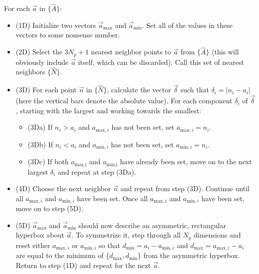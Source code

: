 \documentclass[useAMS,usenatbib]{aastex}
\begin{document}
For each $\vec{a}$ in $\{\hat{A}\}$:
\begin{itemize}
\item(1D) Initialize two vectors $\vec{a}_\text{max}$ and
$\vec{a}_\text{min}$.  Set all of the values in these vectors to some nonsense number.

\item(2D) Select the $3N_p+1$ nearest neighbor points to $\vec{a}$ from
$\{\hat{A}\}$ (this will obviously include $\vec{a}$ itself, which can be discarded).  Call
this set of nearest neighbors $\{\hat{N}\}$.
\\
\item(3D) For each point $\vec{n}$ in $\{\hat{N}\}$, calculate the vector
$\vec{\delta}$ such that $\delta_i=|n_i-a_i|$ (here the vertical bars denote the absolute value).  
For each component
$\delta_i$ of $\vec{\delta}$, starting with the largest and working towards the smallest:
\\
\begin{itemize}
\item(3Da) If $n_i>a_i$ and $a_{\text{max},i}$ has not been set, set $a_{\text{max},i}=n_i$.
\\
\item(3Db) If $n_i<a_i$ and $a_{\text{min},i}$ has not been set, set $a_{\text{min},i}=n_i$.
\\
\item(3Dc) If both $a_\text{max,i}$ and $a_\text{min,i}$ have already been set, move on to the
next largest $\delta_i$ and repeat at step (3Da).
\end{itemize}
\item(4D) Choose the next neighbor $\vec{n}$ and repeat from step (3D). Continue until all
$a_{\text{max},i}$ and $a_{\text{min},i}$ have been set.  Once all $a_{\text{max},i}$ and
$a_{\text{min},i}$ have been set, move on to step (5D).
\\
\item(5D) $\vec{a}_\text{max}$ and $\vec{a}_\text{min}$ should now describe an asymmetric,
rectangular hyperbox about $\vec{a}$.  To symmetrize it, step through all $N_p$ dimensions
and reset either $a_{\text{max},i}$ or $a_{\text{min},i}$ so that 
$d_\text{min}=a_i-a_{\text{min},i}$ and
$d_\text{max}=a_{\text{max},i}-a_i$ are equal to the minimum of $\{d_\text{max},d_\text{min}\}$
from the asymmetric hyperbox.  Return to step (1D) and repeat for the next $\vec{a}$.
\end{itemize}
\end{document}
